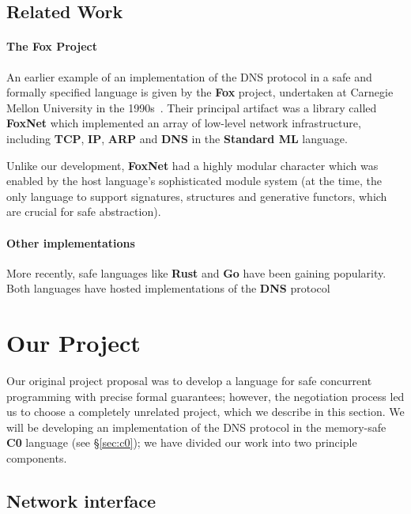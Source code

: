 \documentclass{article}
\newcommand\Kwd[1]{{\sffamily\bfseries{#1}}}
\begin{document}
\subsection{Related Work}

\paragraph{The \Kwd{Fox} Project}
An earlier example of an implementation of the DNS protocol in a safe
and formally specified language is given by the \Kwd{Fox} project,
undertaken at Carnegie Mellon University in the
1990s~\cite{biagioni-harper-lee-milnes:1994,
  biagioni-harper-lee:2001}. Their principal artifact was a library
called \Kwd{FoxNet} which implemented an array of low-level network
infrastructure, including \Kwd{TCP}, \Kwd{IP}, \Kwd{ARP} and \Kwd{DNS}
in the \Kwd{Standard ML} language.

Unlike our development, \Kwd{FoxNet} had a highly modular character
which was enabled by the host language's sophisticated module system
(at the time, the only language to support signatures, structures and
generative functors, which are crucial for safe abstraction).

\paragraph{Other implementations} More recently, safe languages like
\Kwd{Rust} and \Kwd{Go} have been gaining popularity. Both languages
have hosted implementations of the \Kwd{DNS}
protocol~\cite{github:trust-dns,github:miekg-dns}


\section{Our Project}

Our original project proposal was to develop a language for safe
concurrent programming with precise formal guarantees; however, the
negotiation process led us to choose a completely unrelated project,
which we describe in this section. We will be developing an
implementation of the DNS protocol in the memory-safe \Kwd{C0}
language (see \S\ref{sec:c0}); we have divided our work into two
principle components.

\subsection{Network interface}\label{sec:network-interface}
\end{document}
